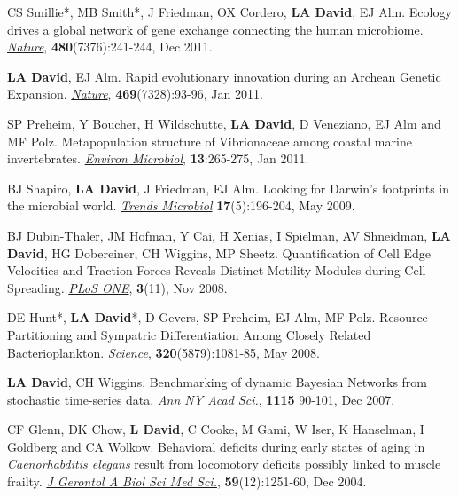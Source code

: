 \documentclass[overlapped,line,11pt]{res}
\begin{document}
\begin{resume}
\begin{revnumerate}[14]
\item {CS Smillie*, MB Smith*, J Friedman, OX Cordero, \textbf{LA
    David}, EJ Alm.  Ecology drives a global network of gene exchange
  connecting the human microbiome. \emph{\underline{Nature}},
  \textbf{480}(7376):241-244, Dec 2011.}

\item {\textbf{LA David}, EJ Alm.  Rapid evolutionary innovation during
  an Archean Genetic Expansion.  \emph{\underline{Nature}},
  \textbf{469}(7328):93-96, Jan 2011.}

\vspace*{1mm}
\item {SP Preheim, Y Boucher, H Wildschutte, \textbf{LA David},
  D Veneziano, EJ Alm and MF Polz.  Metapopulation
  structure of Vibrionaceae among coastal marine
  invertebrates. \emph{\underline{Environ Microbiol}}, \textbf{13}:265-275, Jan 2011.} 

\vspace*{1mm}
\item {BJ Shapiro, \textbf{LA David}, J Friedman, EJ Alm. Looking for
Darwin's footprints in the microbial world.  \emph{\underline{Trends Microbiol}}
\textbf{17}(5):196-204, May 2009.}

\vspace*{1mm}
\item { BJ Dubin-Thaler, JM Hofman, Y Cai, H Xenias, I Spielman, AV
  Shneidman, \textbf{LA David}, HG Dobereiner, CH Wiggins, MP Sheetz.
  Quantification of Cell Edge Velocities and Traction Forces Reveals
  Distinct Motility Modules during Cell Spreading. \emph{\underline{PLoS ONE}},
  \textbf{3}(11), Nov 2008.}

\vspace*{1mm}
\item {DE Hunt*, \textbf{LA David}*, D Gevers, SP Preheim, EJ Alm, MF
Polz.  Resource Partitioning and Sympatric Differentiation Among
Closely Related Bacterioplankton.  \emph{\underline{Science}},
\textbf{320}(5879):1081-85, May 2008.}

\vspace*{1mm}
\item {\textbf{LA David}, CH Wiggins. Benchmarking of dynamic Bayesian
  Networks from stochastic time-series data. \emph{\underline{Ann NY Acad Sci.}},
  \textbf{1115} 90-101, Dec 2007.}

\vspace*{1mm}
\item {CF Glenn, DK Chow, \textbf{L David}, C Cooke, M Gami, W Iser, K
  Hanselman, I Goldberg and CA Wolkow. Behavioral deficits during
  early states of aging in {\em Caenorhabditis elegans} result from
  locomotory deficits possibly linked to muscle frailty. \emph{\underline{J
    Gerontol A Biol Sci Med Sci.}}, \textbf{59}(12):1251-60, Dec 2004.}
\end{revnumerate}


\end{resume}
\end{document}
